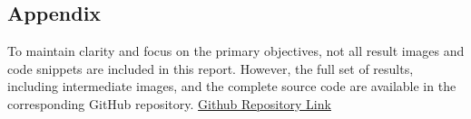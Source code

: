 \documentclass[a4paper,12pt]{article}
\begin{document}
\begin{multicols}{2}
\section{Appendix}
To maintain clarity and focus on the primary objectives, not all result images and code snippets are included in this report. However, the full set of results, including intermediate images, and the complete source code are available in the corresponding GitHub repository.
\href{https://github.com/aelmahraoui/MSc-IPS/tree/main/01.%201st%20semester/Computer%20Vision/Assignments/A01}{Github Repository Link}






% 
% 

\end{multicols}
\end{document}
